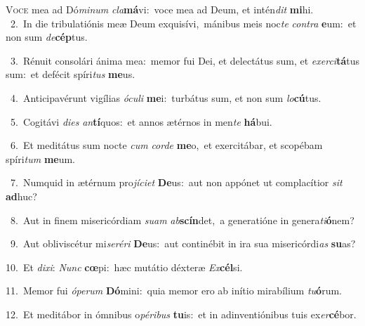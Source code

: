 \lettrine{\initial\textcolor{\initialcolor}{V}}{oce} mea ad Dó\-\textit{mi}\-\textit{num} \textit{cla}\-\textbf{má}vi:~\star voce mea ad Deum, et intén\textit{dit} \textbf{mi}\-hi.\\
{\numbfont\textcolor{\numbcolor}{~2.}}~In die tribulatiónis meæ Deum exquisívi,~\dagger mánibus meis noc\textit{te} \textit{con}\-\textit{tra} \textbf{e}\-um:~\star et non sum \textit{de}\-\textbf{cép}tus.\par
{\numbfont\textcolor{\numbcolor}{~3.}}~Rénuit consolári ánima mea:~\dagger memor fui Dei, et delectátus sum, et \textit{ex}\-\textit{er}\textit{ci}\textbf{tá}tus sum:~\star et defécit spíri\textit{tus} \textbf{me}\-us.\par
{\numbfont\textcolor{\numbcolor}{~4.}}~Anticipavérunt vigílias \textit{ó}\-\textit{cu}\textit{li} \textbf{me}\-i:~\star turbátus sum, et non sum \textit{lo}\-\textbf{cú}tus.\par
{\numbfont\textcolor{\numbcolor}{~5.}}~Cogitávi \textit{di}\-\textit{es} \textit{an}\-\textbf{tí}quos:~\star et annos ætérnos in men\textit{te} \textbf{há}\-bui.\par
{\numbfont\textcolor{\numbcolor}{~6.}}~Et meditátus sum nocte \textit{cum} \textit{cor}\-\textit{de} \textbf{me}\-o,~\star et exercitábar, et scopébam spíri\textit{tum} \textbf{me}\-um.\par
{\numbfont\textcolor{\numbcolor}{~7.}}~Numquid in ætérnum pro\-\textit{jí}\-\textit{ci}\textit{et} \textbf{De}\-us:~\star aut non appónet ut complacítior \textit{sit} \textbf{ad}\-huc?\par
{\numbfont\textcolor{\numbcolor}{~8.}}~Aut in finem misericórdiam \textit{su}\-\textit{am} \textit{ab}\-\textbf{scín}det,~\star a generatióne in genera\-\textit{ti}\-\textbf{ó}nem?\par
{\numbfont\textcolor{\numbcolor}{~9.}}~Aut obliviscétur mi\-\textit{se}\-\textit{ré}\textit{ri} \textbf{De}\-us:~\star aut continébit in ira sua misericórdi\textit{as} \textbf{su}\-as?\par
{\numbfont\textcolor{\numbcolor}{10.}}~Et \textit{di}\-\textit{xi}: \textit{Nunc} \textbf{cœ}\-pi:~\star hæc mutátio déxteræ \textit{Ex}\-\textbf{cél}si.\par
{\numbfont\textcolor{\numbcolor}{11.}}~Memor fui \textit{ó}\-\textit{pe}\textit{rum} \textbf{Dó}\-mini:~\star quia memor ero ab inítio mirabílium \textit{tu}\-\textbf{ó}rum.\par
{\numbfont\textcolor{\numbcolor}{12.}}~Et meditábor in ómnibus o\-\textit{pé}\-\textit{ri}\textit{bus} \textbf{tu}\-is:~\star et in adinventiónibus tuis ex\-\textit{er}\-\textbf{cé}bor.\par
